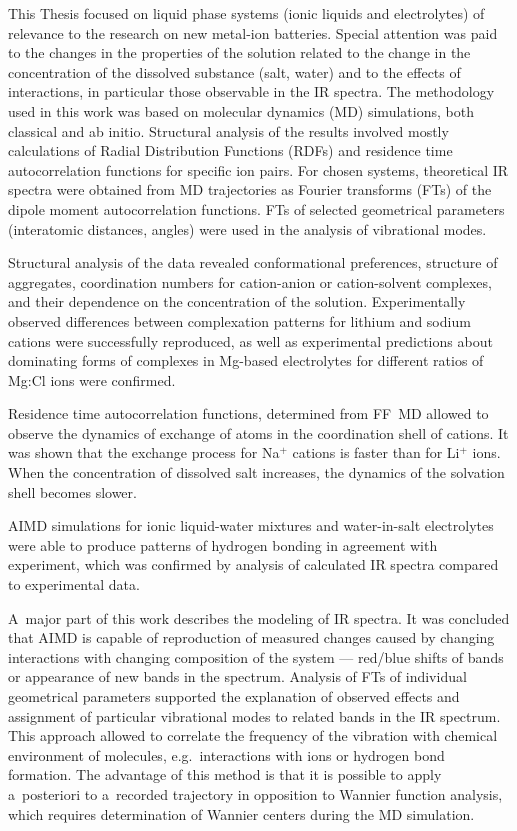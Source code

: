 This Thesis focused on liquid phase systems (ionic liquids and electrolytes) of relevance to the research on new metal-ion batteries. Special attention was paid to the changes in the properties of the solution related to the change in the concentration of the dissolved substance (salt, water) and to the effects of interactions, in particular those observable in the IR spectra. The methodology used in this work was based on molecular dynamics (MD) simulations, both classical and ab initio. Structural analysis of the results involved mostly calculations of Radial Distribution Functions (RDFs) and residence time autocorrelation functions for specific ion pairs. For chosen systems, theoretical IR spectra were obtained from MD trajectories as Fourier transforms (FTs) of the dipole moment autocorrelation functions. FTs of selected geometrical parameters (interatomic distances, angles) were used in the analysis of vibrational modes.

Structural analysis of the data revealed conformational preferences, structure of aggregates, coordination numbers for cation-anion or cation-solvent complexes, and their dependence on the concentration of the solution. Experimentally observed differences between complexation patterns for lithium and sodium cations were successfully reproduced, as well as experimental predictions about dominating forms of complexes in Mg-based electrolytes for different ratios of Mg:Cl ions were confirmed.

Residence time autocorrelation functions, determined from FF~MD allowed to observe the dynamics of exchange of atoms in the coordination shell of cations. It was shown that the exchange process for Na$^{+}$ cations is faster than for Li$^{+}$ ions. When the concentration of dissolved salt increases, the dynamics of the solvation shell becomes slower.

AIMD simulations for ionic liquid-water mixtures and water-in-salt electrolytes were able to produce patterns of hydrogen bonding in agreement with experiment, which was confirmed by analysis of calculated IR spectra compared to experimental data.

A~major part of this work describes the modeling of IR spectra. It was concluded that AIMD is capable of reproduction of measured changes caused by changing interactions with changing composition of the system --- red/blue shifts of bands or appearance of new bands in the spectrum. Analysis of FTs of individual geometrical parameters supported the explanation of observed effects and assignment of particular vibrational modes to related bands in the IR spectrum. This approach allowed to correlate the frequency of the vibration with chemical environment of molecules, e.g.~interactions with ions or hydrogen bond formation. The advantage of this method is that it is possible to apply a~posteriori to a~recorded trajectory in opposition to Wannier function analysis, which requires determination of Wannier centers during the MD simulation.

